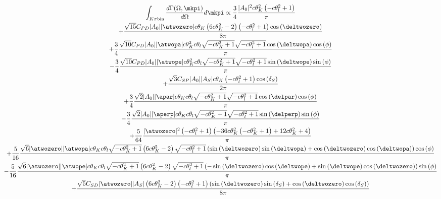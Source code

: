 {\footnotesize
\begin{multline}
\int_{K\pi {\rm bin}}\frac{d\Gamma(\Omega,\mkpi)}{d\Omega}d\mkpi \propto \frac{3}{4} \frac{|A_{0}|^{2} c\theta_{K}^{2} \left(- c\theta_{l}^{2} + 1\right)}{\pi} \\ 
+\frac{\sqrt{15} C_{{PD}} |A_{0}| |\atwozero| c\theta_{K} \left(6 c\theta_{K}^{2} -2\right) \left(- c\theta_{l}^{2} + 1\right) \operatorname{cos}\left(\deltwozero\right)}{8 \pi} \\ 
+\frac{3}{4} \frac{\sqrt{10} C_{{PD}} |A_{0}| |\atwopa| c\theta_{K}^{2} c\theta_{l} \sqrt{- c\theta_{K}^{2} + 1} \sqrt{- c\theta_{l}^{2} + 1} \operatorname{cos}\left(\deltwopa\right) \operatorname{cos}\left(\phi\right)}{\pi} \\ 
- \frac{3}{4} \frac{\sqrt{10} C_{{PD}} |A_{0}| |\atwope| c\theta_{K}^{2} c\theta_{l} \sqrt{- c\theta_{K}^{2} + 1} \sqrt{- c\theta_{l}^{2} + 1} \operatorname{sin}\left(\deltwope\right) \operatorname{sin}\left(\phi\right)}{\pi} \\ 
+\frac{\sqrt{3} C_{{SP}} |A_{0}| |A_{S}| c\theta_{K} \left(- c\theta_{l}^{2} + 1\right) \operatorname{cos}\left(\delta_{S}\right)}{2 \pi} \\ 
+\frac{3}{4} \frac{\sqrt{2} |A_{0}| |\apar| c\theta_{K} c\theta_{l} \sqrt{- c\theta_{K}^{2} + 1} \sqrt{- c\theta_{l}^{2} + 1} \operatorname{cos}\left(\delpar\right) \operatorname{cos}\left(\phi\right)}{\pi} \\ 
- \frac{3}{4} \frac{\sqrt{2} |A_{0}| |\aperp| c\theta_{K} c\theta_{l} \sqrt{- c\theta_{K}^{2} + 1} \sqrt{- c\theta_{l}^{2} + 1} \operatorname{sin}\left(\delperp\right) \operatorname{sin}\left(\phi\right)}{\pi} \\ 
+\frac{5}{64} \frac{|\atwozero|^{2} \left(- c\theta_{l}^{2} + 1\right) \left(- 36 c\theta_{K}^{2} \left(- c\theta_{K}^{2} + 1\right) + 12 c\theta_{K}^{2} + 4\right)}{\pi} \\ 
+\frac{5}{16} \frac{\sqrt{6} |\atwozero| |\atwopa| c\theta_{K} c\theta_{l} \sqrt{- c\theta_{K}^{2} + 1} \left(6 c\theta_{K}^{2} -2\right) \sqrt{- c\theta_{l}^{2} + 1} \left(\operatorname{sin}\left(\deltwozero\right) \operatorname{sin}\left(\deltwopa\right) + \operatorname{cos}\left(\deltwozero\right) \operatorname{cos}\left(\deltwopa\right)\right) \operatorname{cos}\left(\phi\right)}{\pi} \\ 
- \frac{5}{16} \frac{\sqrt{6} |\atwozero| |\atwope| c\theta_{K} c\theta_{l} \sqrt{- c\theta_{K}^{2} + 1} \left(6 c\theta_{K}^{2} -2\right) \sqrt{- c\theta_{l}^{2} + 1} \left(- \operatorname{sin}\left(\deltwozero\right) \operatorname{cos}\left(\deltwope\right) + \operatorname{sin}\left(\deltwope\right) \operatorname{cos}\left(\deltwozero\right)\right) \operatorname{sin}\left(\phi\right)}{\pi} \\ 
+\frac{\sqrt{5} C_{{SD}} |\atwozero| |A_{S}| \left(6 c\theta_{K}^{2} -2\right) \left(- c\theta_{l}^{2} + 1\right) \left(\operatorname{sin}\left(\deltwozero\right) \operatorname{sin}\left(\delta_{S}\right) + \operatorname{cos}\left(\deltwozero\right) \operatorname{cos}\left(\delta_{S}\right)\right)}{8 \pi} \\ \nonumber
\end{multline}}

